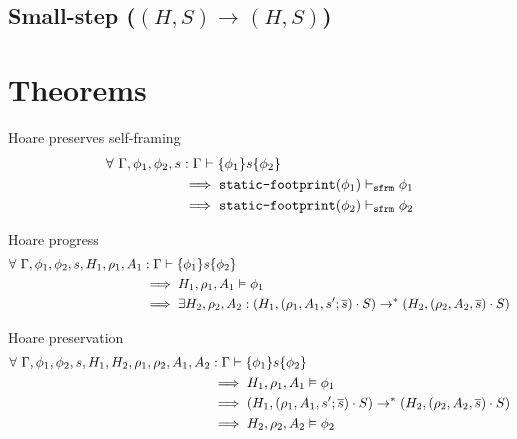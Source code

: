 \documentclass[11pt,a4paper]{article}
\begin{document}
\newcommand{\Heap}{H}
\newcommand{\sstepGeneric}[5]{({#1}, {#2}) \rightarrow^{#3} ({#4}, {#5})}
\newcommand{\sstep}[4]{\sstepGeneric {#1} {#2} {} {#3} {#4}}
\newcommand{\sstepM}[4]{\sstepGeneric {#1} {#2} * {#3} {#4}} 
\newcommand{\sstepWS}[4]{\sstepGeneric {#1} {{#2} \cdot S} {} {#3} {{#4} \cdot S}}
\newcommand{\sstepWSX}[8]{\sstepGeneric {#1} {({#2},{#3},{#4}) \cdot S} {} {#5} {({#6},{#7},{#8}) \cdot S}}
\subsection{Small-step ($\sstep H S H S$)}


\section{Theorems}
Hoare preserves self-framing
\begin{align*}
\forall~ \Gamma, \phi_1, \phi_2, s &: \Gamma\vdash\{\phi_1\}s\{\phi_2\} 
\\ &\implies \texttt{static-footprint}(\phi_1) \vdash_\texttt{sfrm} \phi_1 
\\ &\implies \texttt{static-footprint}(\phi_2) \vdash_\texttt{sfrm} \phi_2
\end{align*}

Hoare progress
\begin{align*}
\forall~ \Gamma, \phi_1, \phi_2, s, H_1, \rho_1, A_1 &: \Gamma\vdash\{\phi_1\}s\{\phi_2\} 
\\ &\implies H_1,\rho_1,A_1 \vDash \phi_1
\\ &\implies \exists H_2, \rho_2, A_2 : (H_1, (\rho_1, A_1, s' ; \overline{s}) \cdot S)
							\rightarrow^* (H_2, (\rho_2, A_2, \overline{s}) \cdot S)
\end{align*}

Hoare preservation
\begin{align*}
\forall~ \Gamma, \phi_1, \phi_2, s, H_1, H_2, \rho_1, \rho_2, A_1, A_2 &: \Gamma\vdash\{\phi_1\}s\{\phi_2\} 
\\ &\implies H_1,\rho_1,A_1 \vDash \phi_1
\\ &\implies (H_1, (\rho_1, A_1, s' ; \overline{s}) \cdot S)
  \rightarrow^* (H_2, (\rho_2, A_2, \overline{s}) \cdot S)
\\ &\implies H_2,\rho_2,A_2 \vDash \phi_2
\end{align*}
\end{document}
